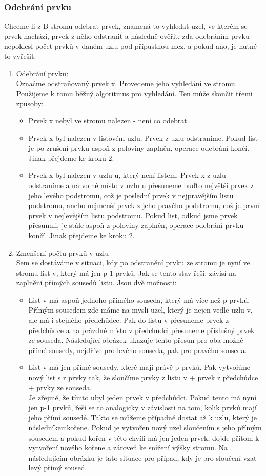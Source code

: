 \documentclass[10pt,a4paper]{article}
\begin{document}
\subsubsection{Odebrání prvku}
Chceme-li z B-stromu odebrat prvek, znamená to vyhledat uzel, ve kterém se prvek nachází, prvek z něho odstranit a následně ověřit, zda odebráním prvku nepoklesl počet prvků v daném uzlu pod přípustnou mez, a pokud ano, je nutné to vyřešit.
\begin{enumerate}
	\item Odebrání prvku: \\
	Označme odstraňovaný prvek x. Provedeme jeho vyhledání ve stromu. Použijeme k tomu běžný algoritmus pro vyhledání. Ten může skončit třemi způsoby:
	\begin{itemize}
		\item Prvek x nebyl ve stromu nalezen - není co odebrat.
		\item Prvek x byl nalezen v listovém uzlu. Prvek z uzlu odstraníme. Pokud list je po zrušení prvku aspoň z poloviny zaplněn, operace odebrání končí. Jinak přejdeme ke kroku 2.
		\item Prvek x byl nalezen v uzlu u, který není listem. Prvek x z uzlu odstraníme a na volné místo v uzlu u přesuneme buďto největší prvek z jeho levého podstromu, což je poslední prvek v nejpravějším listu podstromu, anebo nejmenší prvek z jeho pravého podstromu, což je první prvek v nejlevějším listu podstromu. Pokud list, odkud jsme prvek přesunuli, je stále aspoň z poloviny zaplněn, operace odebrání prvku končí. Jinak přejdeme ke kroku 2.
	\end{itemize}
	\item Zmenšení počtu prvků v uzlu \\
	Sem se dostáváme v situaci, kdy po odstranění prvku ze stromu je nyní ve stromu list v, který má jen p-1 prvků. Jak se tento stav řeší, závisí na zaplnění přímých sousedů listu. Jsou dvě možnosti:
	\begin{itemize}
		\item List v má aspoň jednoho přímého souseda, který má více než p prvků. Přímým sousedem zde máme na mysli uzel, který je nejen vedle uzlu v, ale má i stejného předchůdce. Pak do listu v přesuneme prvek z předchůdce a na prázdné místo v předchůdci přesuneme příslušný prvek ze souseda. Následující obrázek ukazuje tento přesun pro oba možné přímé sousedy, nejdříve pro levého souseda, pak pro pravého souseda.
		\item List v má jen přímé sousedy, které mají právě p prvků. Pak vytvoříme nový list s r prvky tak, že sloučíme prvky z listu v + prvek z předchůdce + prvky ze souseda. \\
		Je zřejmé, že tímto ubyl jeden prvek v předchůdci. Pokud tento má nyní jen p-1 prvků, řeší se to analogicky v závislosti na tom, kolik prvků mají jeho přímí sousedé. Takto se můžeme případně dostat až k uzlu, který je následníkemkořene. Pokud je vytvořen nový uzel sloučením s jeho přímým sousedem a pokud kořen v této chvíli má jen jeden prvek, dojde přitom k vytvoření nového kořene a zároveň ke snížení výšky stromu. Na následujícím obrázku je tato situace pro případ, kdy je pro sloučení vzat levý přímý soused.
	\end{itemize}
\end{enumerate}
\end{document}
